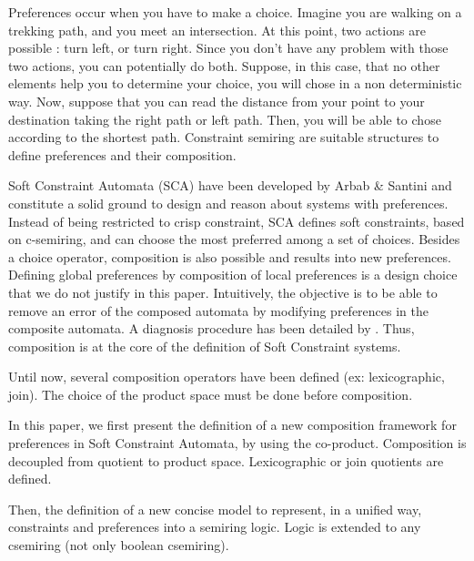 Preferences occur when you have to make a choice. Imagine you are walking on a trekking path, and you meet an intersection. At this point, two actions are possible : turn left, or turn right. Since you don't have any problem with those two actions, you can potentially do both. Suppose, in this case, that no other elements help you to determine your choice, you will chose in a non deterministic way. Now, suppose that you can read the distance from your point to your destination taking the right path or left path. Then, you will be able to chose according to the shortest path. Constraint semiring are suitable structures to define preferences and their composition. 

Soft Constraint Automata (SCA) have been developed by Arbab \& Santini \cite{Arbab2013} and constitute a solid ground to design and reason about systems with preferences. Instead of being restricted to crisp constraint, SCA defines soft constraints, based on c-semiring, and can choose the most preferred among a set of choices. Besides a choice operator, composition is also possible and results into new preferences. Defining global preferences by composition of local preferences is a design choice that we do not justify in this paper. Intuitively, the objective is to be able to remove an error of the composed automata by modifying preferences in the composite automata. A diagnosis procedure has been detailed by \cite{KAT17}. Thus, composition is at the core of the definition of Soft Constraint systems. 

Until now, several composition operators have been defined (ex: lexicographic, join). The choice of the product space must be done before composition.

In this paper, we first present the definition of a new composition framework for preferences in Soft Constraint Automata, by using the co-product. Composition is decoupled from quotient to product space. Lexicographic or join quotients are defined.

Then, the definition of a new concise model to represent, in a unified way, constraints and preferences into a semiring logic. Logic is extended to any csemiring (not only boolean csemiring). 